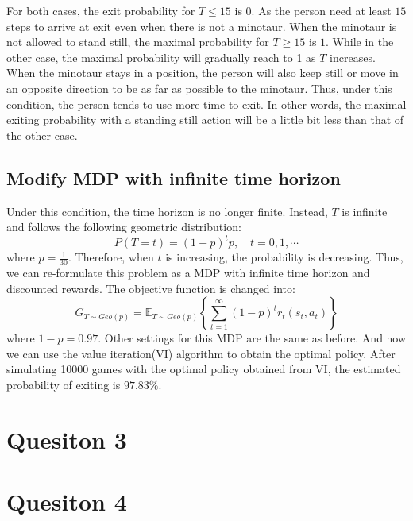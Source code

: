\documentclass{article}
\begin{document}
For both cases, the exit probability for $T\leq 15$ is $0$. As the person need at least $15$ steps to arrive at exit even when there is not a minotaur.
When the minotaur is not allowed to stand still, the maximal probability for $T\geq 15$ is $1$. While in the other case, the maximal probability will gradually reach to 1 as $T$ increases.
When the minotaur stays in a position, the person will also keep still or move in an opposite direction to be as far as possible to the minotaur. 
Thus, under this condition, the person tends to use more time to exit. 
In other words, the maximal exiting probability with a standing still action will be a little bit less than that of the other case. 

\subsection{Modify MDP with infinite time horizon}
Under this condition, the time horizon is no longer finite. Instead, $T$ is infinite and follows the following geometric distribution:
$$P(T=t)=(1-p)^tp, \quad t=0,1,\cdots$$
where $p=\frac{1}{30}$. Therefore, when $t$ is increasing, the probability is decreasing. 
Thus, we can re-formulate this problem as a MDP with infinite time horizon and discounted rewards. The objective function is changed into:
$$G_{T\sim Geo(p)}=\mathbb{E}_{T\sim Geo(p)}\left\{\sum_{t=1}^{\infty}(1-p)^t r_t(s_t,a_t)\right\}$$
where $1-p=0.97$.
Other settings for this MDP are the same as before. And now we can use the value iteration(VI) algorithm to obtain the optimal policy.
After simulating 10000 games with the optimal policy obtained from VI, the estimated probability of exiting is $97.83\%$.

\section{Quesiton 3}

\section{Quesiton 4}
\end{document}

